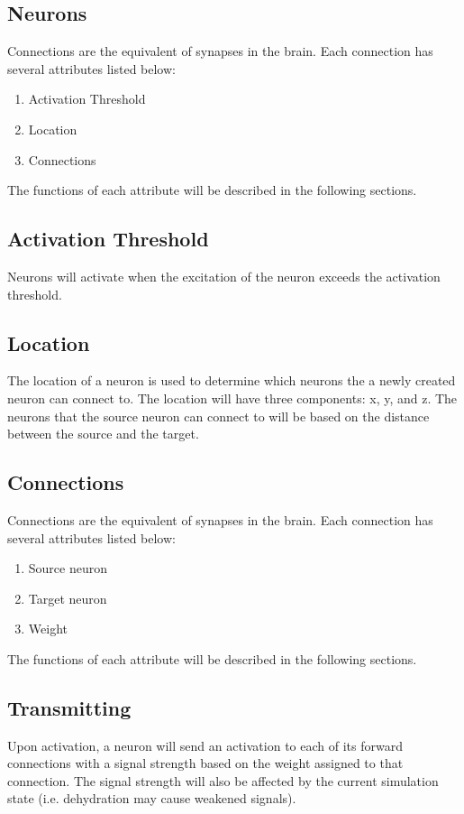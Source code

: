 \documentclass{article} %
\begin{document}
        \subsection{Neurons} Connections are the equivalent of synapses in the brain. Each connection has several attributes listed below: 

        \begin{enumerate}[noitemsep]
            \item Activation Threshold 
            \item Location
            \item Connections
        \end{enumerate}

        The functions of each attribute will be described in the following sections.
        
        \subsection{Activation Threshold}
            Neurons will activate when the excitation of the neuron exceeds the activation threshold.
        
        \subsection{Location}
            The location of a neuron is used to determine which neurons the a newly created neuron can connect to. The location will have three components: x, y, and z. The neurons that the source neuron can connect to will be based on the distance between the source and the target.
        
        \subsection{Connections}
            Connections are the equivalent of synapses in the brain. Each connection has several attributes listed below: 

        \begin{enumerate}[noitemsep]
            \item Source neuron
            \item Target neuron 
            \item Weight
        \end{enumerate}
        The functions of each attribute will be described in the following sections.
        
        \subsection{Transmitting} Upon activation, a neuron will send an activation to each of its forward connections with a signal strength based on the weight assigned to that connection. The signal strength will also be affected by the current simulation state (i.e. dehydration may cause weakened signals).
        
\end{document}
